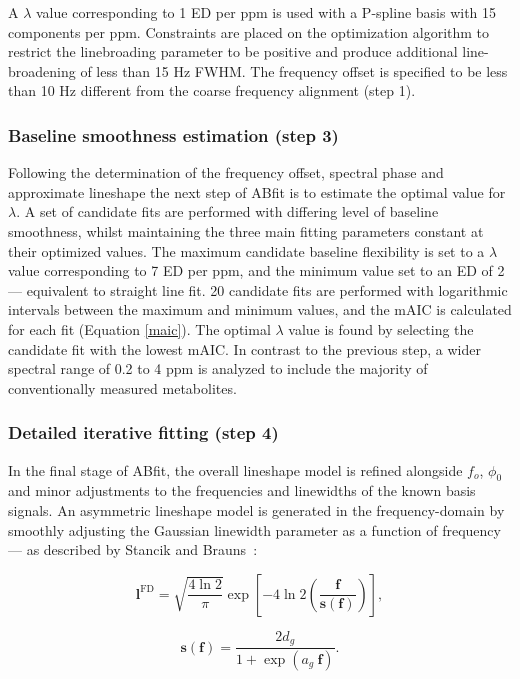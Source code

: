 \documentclass[num-refs]{wiley-article}
\begin{document}
A $\lambda$ value corresponding to 1 ED per ppm is used with a P-spline basis with 15 components per ppm. Constraints are placed on the optimization algorithm to restrict the linebroading parameter to be positive and produce additional line-broadening of less than 15 Hz FWHM. The frequency offset is specified to be less than 10 Hz different from the coarse frequency alignment (step 1).

\subsubsection{Baseline smoothness estimation (step 3)}
Following the determination of the frequency offset, spectral phase and approximate lineshape the next step of ABfit is to estimate the optimal value for $\lambda$. A set of candidate fits are performed with differing level of baseline smoothness, whilst maintaining the three main fitting parameters constant at their optimized values. The maximum candidate baseline flexibility is set to a $\lambda$ value corresponding to 7 ED per ppm, and the minimum value set to an ED of 2 --- equivalent to straight line fit. 20 candidate fits are performed with logarithmic intervals between the maximum and minimum values, and the mAIC is calculated for each fit (Equation \ref{maic}). The optimal $\lambda$ value is found by selecting the candidate fit with the lowest mAIC. In contrast to the previous step, a wider spectral range of 0.2 to 4 ppm is analyzed to include the majority of conventionally measured metabolites.

\subsubsection{Detailed iterative fitting (step 4)}
In the final stage of ABfit, the overall lineshape model is refined alongside $f_{o}$, $\phi_{0}$ and minor adjustments to the frequencies and linewidths of the known basis signals. An asymmetric lineshape model is generated in the frequency-domain by smoothly adjusting the Gaussian linewidth parameter as a function of frequency --- as described by Stancik and Brauns~\cite{Stancik2008}:

\begin{equation}
  \mathbf{l}^{\mathrm{FD}} = \sqrt{\frac{4 \ln 2}{\pi}} \exp \left[ -4 \ln2 \left( \frac{\mathbf{f}}{\mathbf{s}(\mathbf{f})} \right) \right],
\end{equation}

\begin{equation}
  \mathbf{s}(\mathbf{f}) = \frac{2 d_{g}}{1 + \exp(a_{g} \ \mathbf{f})}.
\end{equation}
\end{document}
